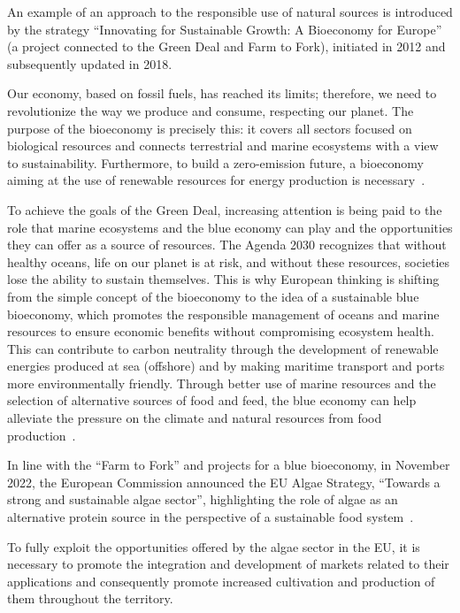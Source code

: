 An example of an approach to the responsible use of natural sources is introduced by the strategy “Innovating for Sustainable Growth: A Bioeconomy for Europe” (a project connected to the Green Deal and Farm to Fork), initiated in 2012 and subsequently updated in 2018.

Our economy, based on fossil fuels, has reached its limits; therefore, we need to revolutionize the way we produce and consume, respecting our planet. The purpose of the bioeconomy is precisely this: it covers all sectors focused on biological resources and connects terrestrial and marine ecosystems with a view to sustainability. Furthermore, to build a zero-emission future, a bioeconomy aiming at the use of renewable resources for energy production is necessary~\parencite{eucommission_sustainable_2018}.

To achieve the goals of the Green Deal, increasing attention is being paid to the role that marine ecosystems and the blue economy can play and the opportunities they can offer as a source of resources. The Agenda 2030 recognizes that without healthy oceans, life on our planet is at risk, and without these resources, societies lose the ability to sustain themselves. This is why European thinking is shifting from the simple concept of the bioeconomy to the idea of a sustainable blue bioeconomy, which promotes the responsible management of oceans and marine resources to ensure economic benefits without compromising ecosystem health. This can contribute to carbon neutrality through the development of renewable energies produced at sea (offshore) and by making maritime transport and ports more environmentally friendly. Through better use of marine resources and the selection of alternative sources of food and feed, the blue economy can help alleviate the pressure on the climate and natural resources from food production~\parencite{sustainable_blue_economy_2021}.

In line with the “Farm to Fork” and projects for a blue bioeconomy, in November 2022, the European Commission announced the EU Algae Strategy, “Towards a strong and sustainable algae sector”, highlighting the role of algae as an alternative protein source in the perspective of a sustainable food system~\parencite{blue_bioeconomy}.

To fully exploit the opportunities offered by the algae sector in the EU, it is necessary to promote the integration and development of markets related to their applications and consequently promote increased cultivation and production of them throughout the territory.

